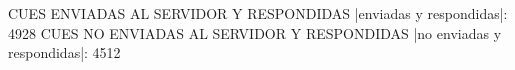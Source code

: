 CUES ENVIADAS AL SERVIDOR Y RESPONDIDAS
|enviadas y respondidas|: 4928
CUES NO ENVIADAS AL SERVIDOR Y RESPONDIDAS
|no enviadas y respondidas|: 4512